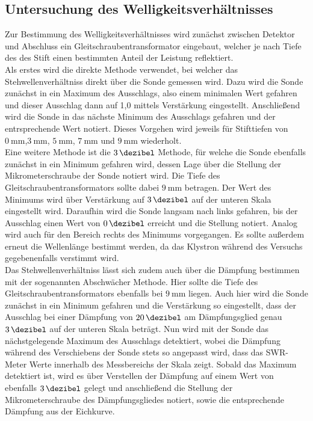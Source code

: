 \subsection{Untersuchung des Welligkeitsverhältnisses}
Zur Bestimmung des Welligkeitsverhältnisses wird zunächst zwischen Detektor und Abschluss ein
Gleitschraubentransformator eingebaut, welcher je nach Tiefe des des Stift einen bestimmten
Anteil der Leistung reflektiert. \\
Als erstes wird die direkte Methode verwendet, bei welcher das Stehwellenverhältniss direkt über die
Sonde gemessen wird. Dazu wird die Sonde zunächst in ein Maximum des Ausschlags, also einem minimalen
Wert gefahren und dieser Ausschlag dann auf 1,0 mittels Verstärkung eingestellt. Anschließend
wird die Sonde in das nächste Minimum des Ausschlags gefahren und der entrsprechende Wert notiert.
Dieses Vorgehen wird jeweils für Stifttiefen von $\SI{0}{\milli\meter}$,$\SI{3}{\milli\meter}$,
$\SI{5}{\milli\meter}$, $\SI{7}{\milli\meter}$ und $\SI{9}{\milli\meter}$ wiederholt. \\
Eine weitere Methode ist die $\SI{3}{\dezibel}$ Methode, für welche die Sonde ebenfalls zunächst in
ein Minimum gefahren wird, dessen Lage über die Stellung der Mikrometerschraube der Sonde notiert wird.
Die Tiefe des Gleitschraubentransformators sollte dabei $\SI{9}{\milli\meter}$ betragen.
Der Wert des Minimums wird über Verstärkung auf $\SI{3}{\dezibel}$ auf der unteren
Skala eingestellt wird. Daraufhin wird die Sonde langsam nach links gefahren, bis der Ausschlag einen
Wert von $\SI{0}{\dezibel}$ erreicht und die Stellung notiert. Analog wird auch für den Bereich rechts des Minimums
vorgegangen. Es sollte außerdem erneut die Wellenlänge bestimmt werden, da das Klystron während des
Versuchs gegebenenfalls verstimmt wird. \\
Das Stehwellenverhältniss lässt sich zudem auch über die Dämpfung bestimmen mit der sogenannten Abschwächer
Methode. Hier sollte die Tiefe des Gleitschraubentransformators ebenfalls bei $\SI{9}{\milli\meter}$ liegen.
Auch hier wird die Sonde zunächst in ein Minimum gefahren und die Verstärkung so eingestellt, dass der Ausschlag bei
einer Dämpfung von $\SI{20}{\dezibel}$ am Dämpfungsglied genau $\SI{3}{\dezibel}$ auf der unteren Skala
beträgt. Nun wird mit der Sonde das nächstgelegende Maximum des Ausschlags detektiert, wobei die
Dämpfung während des Verschiebens der Sonde stets so angepasst wird, dass das SWR-Meter Werte innerhalb des
Messbereichs der Skala zeigt. Sobald das Maximum detektiert ist, wird es über Verstellen der Dämpfung
auf einem Wert von ebenfalls $\SI{3}{\dezibel}$ gelegt und anschließend die Stellung der Mikrometerschraube
des Dämpfungsgliedes notiert, sowie die entsprechende Dämpfung aus der Eichkurve.
